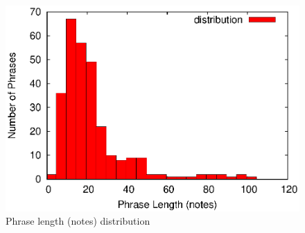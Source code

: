 \begin{figure}[tp]
   \begin{center}
      \includegraphics[width=\textwidth]{fig/phrlength}

   \end{center}
   \caption{Phrase length (notes) distribution}
   \label{fig:phrlength}
\end{figure}






%

